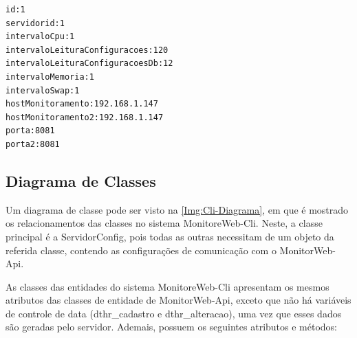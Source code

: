 \begin{lstlisting}[label=Func:ExemploArquivoConfigFile.conf,caption={[Exemplo de um arquivo configFile.conf]Exemplo de um arquivo configFile.conf}]
id:1
servidorid:1
intervaloCpu:1
intervaloLeituraConfiguracoes:120
intervaloLeituraConfiguracoesDb:12
intervaloMemoria:1
intervaloSwap:1
hostMonitoramento:192.168.1.147
hostMonitoramento2:192.168.1.147
porta:8081
porta2:8081
\end{lstlisting}


\subsection{Diagrama de Classes}\label{subsec:DiagramaDeClassesMonitorwebcli}

Um diagrama de classe pode ser visto na \autoref{Img:Cli-Diagrama}, em que é mostrado os relacionamentos das classes no sistema MonitoreWeb-Cli. Neste, a classe principal é a ServidorConfig, pois todas as outras necessitam de um objeto da referida classe, contendo as configurações de comunicação com o MonitorWeb-Api. 

As classes das entidades do sistema MonitoreWeb-Cli apresentam os mesmos atributos das classes de entidade de MonitorWeb-Api, exceto que não há variáveis de controle de data (dthr\_cadastro e dthr\_alteracao), uma vez que esses dados são geradas pelo servidor. Ademais, possuem os seguintes atributos e métodos:


